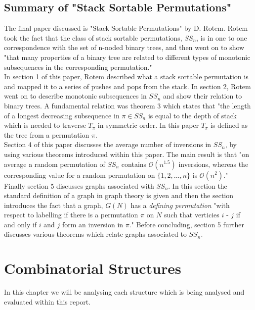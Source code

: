 \documentclass[12pt]{article}
\newcommand{\bigO}{\ensuremath{\mathcal{O}}}
\begin{document}
\subsection{Summary of "Stack Sortable Permutations"}
The final paper discussed is "Stack Sortable Permutations" by D. Rotem. \cite{Rotem1981185} Rotem took the fact that the class of stack sortable permutations, $SS_n$,  is in one to one correspondence with the set of n-noded binary trees, and then went on to show "that many properties of a binary tree are related to different types of monotonic subsequences in the corresponding permutation."\\
In section 1 of this paper, Rotem described what a stack sortable permutation is and mapped it to a series of pushes and pops from the stack. In section 2, Rotem went on to describe monotonic subsequences in $SS_n$ and show their relation to binary trees. A fundamental relation was theorem 3 which states that "the length of a longest decreasing subsequence in $\pi \in SS_n$ is equal to the depth of stack which is needed to traverse $T_{\pi}$ in symmetric order. In this paper $T_{\pi}$ is defined as the tree from a permutation $\pi$.\\
Section 4 of this paper discusses the average number of inversions in $SS_n$, by using various theorems introduced within this paper. The main result is that "on average a random permutation of $SS_n$ contains $\bigO(n^{1.5})$ inversions, whereas the corresponding value for a random permutation on $\{1,2,\dotsc, n\}$ is $\bigO(n^2)$."\\
Finally section 5 discusses graphs associated with $SS_n$. In this section the standard definition of a graph in graph theory is given and then the section introduces the fact that a graph, $G(N)$ has a {\it defining permutation} "with respect to labelling if there is a permutation $\pi$ on $N$ such that verticies $i$ - $j$ if and only if $i$ and $j$ form an inversion in $\pi$." Before concluding, section 5 further discusses various theorems which relate graphs associated to $SS_n$. 
\section{Combinatorial Structures}
In this chapter we will be analysing each structure which is being analysed and evaluated within this report.
\end{document}

